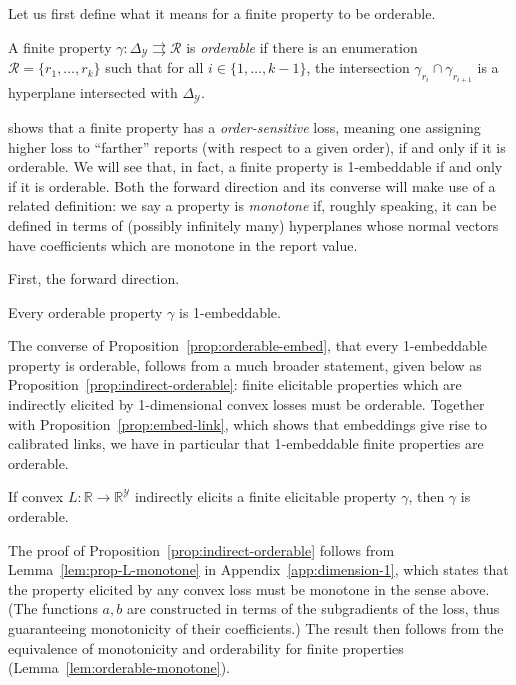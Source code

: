 \documentclass[anon]{colt2020} %
\newcommand{\reals}{\mathbb{R}}
\newcommand{\simplex}{\Delta_\Y}
\newcommand{\R}{\mathcal{R}}
\newcommand{\Y}{\mathcal{Y}}
\newcommand{\toto}{\rightrightarrows}
\begin{document}
Let us first define what it means for a finite property to be orderable.
\begin{definition}
	A finite property $\gamma:\simplex\toto\R$ is \emph{orderable} if there is an enumeration $\R = \{r_1,\ldots,r_k\}$ such that for all $i\in\{1,\ldots,k-1\}$, the intersection $\gamma_{r_i} \cap \gamma_{r_{i+1}}$ is a hyperplane intersected with $\simplex$.
\end{definition}

\citet{lambert2018elicitation} shows that a finite property has a \emph{order-sensitive} loss, meaning one assigning higher loss to ``farther'' reports (with respect to a given order), if and only if it is orderable.
We will see that, in fact, a finite property is 1-embeddable if and only if it is orderable.
Both the forward direction and its converse will make use of a related definition: we say a property is \emph{monotone} if, roughly speaking, it can be defined in terms of (possibly infinitely many) hyperplanes whose normal vectors have coefficients which are monotone in the report value.

First, the forward direction.

\begin{proposition}\label{prop:orderable-embed}
	Every orderable property $\gamma$ is 1-embeddable.
\end{proposition}

The converse of Proposition~\ref{prop:orderable-embed}, that every 1-embeddable property is orderable, follows from a much broader statement, given below as Proposition~\ref{prop:indirect-orderable}: finite elicitable properties which are indirectly elicited by 1-dimensional convex losses must be orderable.
Together with Proposition~\ref{prop:embed-link}, which shows that embeddings give rise to calibrated links, we have in particular that 1-embeddable finite properties are orderable.

\begin{proposition}\label{prop:indirect-orderable}
	If convex $L : \reals \to \reals^\Y$ indirectly elicits a finite elicitable property $\gamma$, then $\gamma$ is orderable.
\end{proposition}

The proof of Proposition~\ref{prop:indirect-orderable} follows from Lemma~\ref{lem:prop-L-monotone} in Appendix~\ref{app:dimension-1}, which states that the property elicited by any convex loss must be monotone in the sense above.
(The functions $a,b$ are constructed in terms of the subgradients of the loss, thus guaranteeing monotonicity of their coefficients.)
The result then follows from the equivalence of monotonicity and orderability for finite properties (Lemma~\ref{lem:orderable-monotone}).
\end{document}
